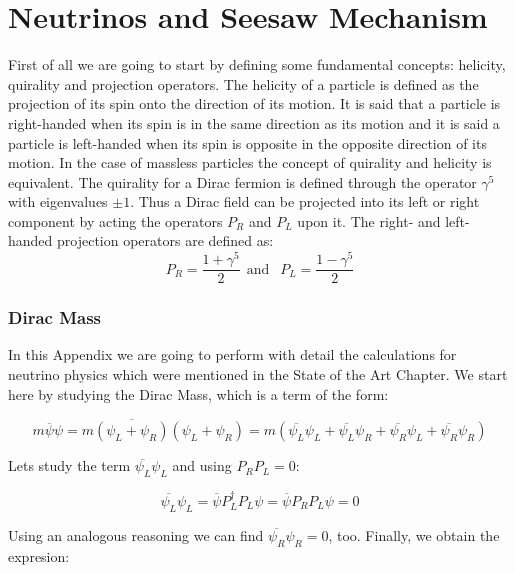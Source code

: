 \chapter{Neutrinos and Seesaw Mechanism} \label{apendice_neutrinos}


First of all we are going to start by defining some fundamental concepts: helicity, quirality and projection operators. The helicity of a particle is defined as the projection of its spin onto the direction of its motion. It is said that a particle is right-handed when its spin is in the same direction as its motion and it is said a particle is left-handed when its spin is opposite in the opposite direction of its motion. In the case of massless particles the concept of quirality and helicity is equivalent. The quirality for a Dirac fermion is defined through the operator $\gamma^5$ with eigenvalues $\pm 1$. Thus a Dirac field can be projected into its left or right component by acting the operators $P_R$ and $P_L$ upon it. The right- and left-handed projection operators are defined as:
\begin{equation}
P_R = \frac{1 + \gamma^5}{2} \ \ \text{and } \ \ P_L = \frac{1 - \gamma^5}{2}
\end{equation}


\subsection{Dirac Mass}
In this Appendix we are going to perform with detail the calculations for neutrino physics which were mentioned in the State of the Art Chapter. 
We start here by studying the Dirac Mass, which is a term of the form:

\begin{equation}
 m \overline{\psi} \psi = m \overline{(\psi_L + \psi_R)} (\psi_L + \psi_R) = m(\overline{\psi_L} \psi_L + \overline{\psi_L}\psi_R + \overline{\psi_R}\psi_L + \overline{\psi_R} \psi_R)
\end{equation}

Lets study the term $\overline{\psi_L}\psi_L$ and using $P_R  P_L = 0$:

\begin{equation}
 \overline{\psi_L}\psi_L = \overline{\psi} {P}^{\dagger}_L P_L \psi = \overline{\psi}P_R  P_L \psi = 0
\end{equation}

Using an analogous reasoning we can find $\overline{\psi_R}\psi_R = 0$, too. Finally, we obtain the expresion:

